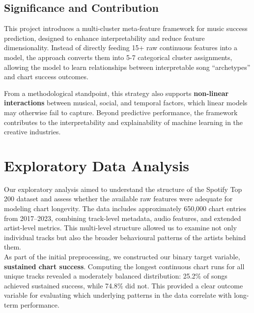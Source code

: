 \documentclass{article}
\begin{document}
\subsection{Significance and Contribution}
This project introduces a multi-cluster meta-feature framework for music success prediction, designed to enhance interpretability and reduce feature dimensionality. Instead of directly feeding 15+ raw continuous features into a model, the approach converts them into 5-7 categorical cluster assignments, allowing the model to learn relationships between interpretable song “archetypes” and chart success outcomes. 

From a methodological standpoint, this strategy also supports \textbf{non-linear interactions} between musical, social, and temporal factors, which linear models may otherwise fail to capture. Beyond predictive performance, the framework contributes to the interpretability and explainability of machine learning in the creative industries.

\section{Exploratory Data Analysis}
\vspace{-0.6em}
Our exploratory analysis aimed to understand the structure of the Spotify Top 200 dataset and assess whether the available raw features were adequate for modeling chart longevity. The data includes approximately 650,000 chart entries from 2017–2023, combining track-level metadata, audio features, and extended artist-level metrics. This multi-level structure allowed us to examine not only individual tracks but also the broader behavioural patterns of the artists behind them.\\
As part of the initial preprocessing, we constructed our binary target variable, \textbf{sustained chart success}. Computing the longest continuous chart runs for all unique tracks revealed a moderately balanced distribution: 25.2\% of songs achieved sustained success, while 74.8\% did not. This provided a clear outcome variable for evaluating which underlying patterns in the data correlate with long-term performance. 
\end{document}
